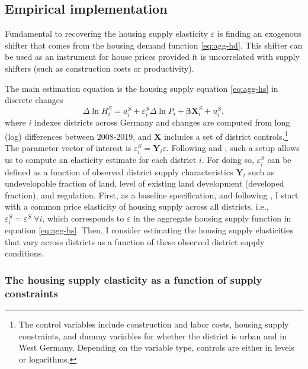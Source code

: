 \documentclass[
  12pt,
]{article}
\begin{document}
\subsection{Empirical implementation}\label{empirical-implementation}

Fundamental to recovering the housing supply elasticity \(\varepsilon\) is finding an exogenous shifter that comes from the housing demand function \eqref{eq:agg-hd}. This shifter can be used as an instrument for house prices provided it is uncorrelated with supply shifters (such as construction costs or productivity).

The main estimation equation is the housing supply equation \eqref{eq:agg-hs} in discrete changes \begin{equation}
\Delta\ln H_i^S =  a^S_i + \varepsilon^S_i\Delta\ln P_i + \boldsymbol{\beta}\mathbf{X}^S_i + u^S_i
\label{eq:main},
\end{equation}where \(i\) indexes districts across Germany and changes are computed from long (log) differences between 2008-2019, and \(\mathbf{X}\) includes a set of district controls.\footnote{The control variables include construction and labor costs, housing supply constraints, and dummy variables for whether the district is urban and in West Germany. Depending on the variable type, controls are either in levels or logarithms.} The parameter vector of interest is \(\varepsilon^S_i=\mathbf{Y}_i\varepsilon\). Following \citet{saiz2010} and \citet{baumsnow-han2019}, such a setup allows us to compute an elasticity estimate for each district \(i\). For doing so, \(\varepsilon^S_i\) can be defined as a function of observed district supply characteristics \(\mathbf{Y}_i\) such as undevelopable fraction of land, level of existing land development (developed fraction), and regulation. First, as a baseline specification, and following \citet{saiz2010}, I start with a common price elasticity of housing supply across all districts, i.e., \(\varepsilon^S_i=\varepsilon^S \;\forall i\), which corresponds to \(\varepsilon\) in the aggregate housing supply function in equation \eqref{eq:agg-hs}. Then, I consider estimating the housing supply elasticities that vary across districts as a function of these observed district supply conditions.

\subsubsection{The housing supply elasticity as a function of supply constraints}\label{decompose}
\end{document}
